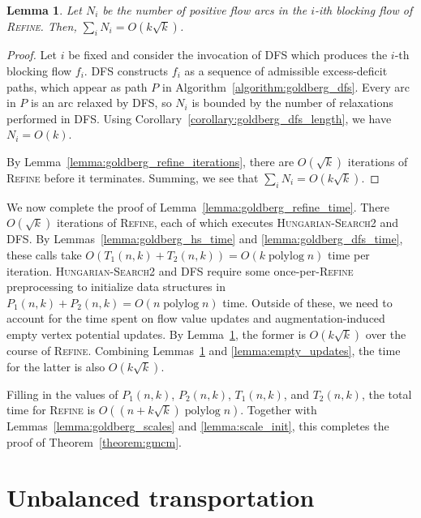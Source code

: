 \documentclass[11pt]{article}
\def\polylog{\mathop{\mathrm{polylog}}}
\theoremstyle{plain}
\newtheorem{lemma}{Lemma}[section]
\numberwithin{figure}{section}
\begin{document}
\begin{lemma}
\label{lemma:goldberg_bf_size}
Let $N_i$ be the number of positive flow arcs in the $i$-ith blocking flow
of \textsc{Refine}.
Then, $\sum_i N_i = O(k\sqrt{k})$.
\end{lemma}

\begin{proof}
Let $i$ be fixed and consider the invocation of \textsc{DFS} which produces the
$i$-th blocking flow $f_i$.
\textsc{DFS} constructs $f_i$ as a sequence of admissible excess-deficit paths,
which appear as path $P$ in Algorithm~\ref{algorithm:goldberg_dfs}.
Every arc in $P$ is an arc relaxed by \textsc{DFS}, so $N_i$ is bounded by the
number of relaxations performed in \textsc{DFS}.
Using Corollary~\ref{corollary:goldberg_dfs_length}, we have $N_i = O(k)$.

By Lemma~\ref{lemma:goldberg_refine_iterations}, there are $O(\sqrt{k})$
iterations of \textsc{Refine} before it terminates.
Summing, we see that $\sum_i N_i = O(k\sqrt{k})$.
\end{proof}

We now complete the proof of Lemma~\ref{lemma:goldberg_refine_time}.
There $O(\sqrt{k})$ iterations of \textsc{Refine}, each of which executes
\textsc{Hungarian-Search2} and \textsc{DFS}.
By Lemmas~\ref{lemma:goldberg_hs_time} and \ref{lemma:goldberg_dfs_time},
these calls take $O(T_1(n, k) + T_2(n, k)) = O(k\polylog n)$ time per
iteration.
\textsc{Hungarian-Search2} and \textsc{DFS} require some
once-per-\textsc{Refine} preprocessing to initialize data structures
in $P_1(n, k) + P_2(n, k) = O(n\polylog n)$ time.
Outside of these, we need to account for the time spent on flow value updates
and augmentation-induced empty vertex potential updates.
By Lemma~\ref{lemma:goldberg_bf_size}, the former is $O(k\sqrt{k})$ over the
course of \textsc{Refine}.
Combining Lemmas~\ref{lemma:goldberg_bf_size} and \ref{lemma:empty_updates},
the time for the latter is also $O(k\sqrt{k})$.

Filling in the values of $P_1(n, k)$, $P_2(n, k)$, $T_1(n, k)$, and
$T_2(n, k)$, the total time for \textsc{Refine} is
$O((n + k\sqrt{k})\polylog n)$.
Together with Lemmas~\ref{lemma:goldberg_scales} and \ref{lemma:scale_init},
this completes the proof of Theorem~\ref{theorem:gmcm}.


\section{Unbalanced transportation}



{


}
\end{document}
